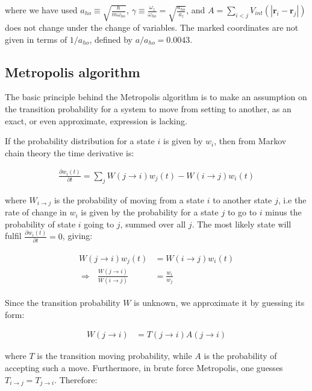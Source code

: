 \documentclass[english, a4paper]{article}
\newcommand{\bm}[1]{\mathbf{#1}}
\begin{document}
where we have used $a_{ho} \equiv \sqrt{\frac{\hbar}{m\omega_{ho}}}$, $\gamma \equiv \frac{\omega_z}{\omega_{ho}} = \sqrt{\frac{a_{ho}}{a_z}}$, and $A = \sum_{i<j} V_{int}(|\bm{r}_i-\bm{r}_j|)$ does not change under the change of variables. The marked coordinates are not given in terms of $1/a_{ho}$, defined by $a/a_{ho} = 0.0043$.

\subsection{Metropolis algorithm}
The basic principle behind the Metropolis algorithm is to make an assumption on the transition probability for a system to move from setting to another, as
an exact, or even approximate, expression is lacking.

If the probability distribution for a state $i$ is given by $w_i$, then from Markov chain theory the time derivative is:

\begin{align}
 \frac{\partial w_i(t)}{\partial t} = \sum_j W(j\rightarrow i)w_j(t) - W(i\rightarrow j)w_i(t)
\end{align}

where $W_{i\rightarrow j}$ is the probability of moving from a state $i$ to another state $j$, i.e the rate of change in $w_i$ is given by the probability for a state $j$ to go to $i$ minus the
probability of state $i$ going to $j$, summed over all $j$.
The most likely state will fulfil $\frac{\partial w_i(t)}{\partial t} = 0$, giving:

\begin{align}
\begin{split}
  W(j\rightarrow i)w_j(t) &=  W(i\rightarrow j)w_i(t)\\
 \Rightarrow\:\:\:\frac{  W(j\rightarrow i)}{  W(i\rightarrow j)} &= \frac{w_i}{w_j}
\end{split}
\end{align}

Since the transition probability $W$ is unknown, we approximate it by guessing its form:

\begin{align}
 W(j\rightarrow i) &= T(j\rightarrow i) A(j\rightarrow i)
\end{align}

where $T$ is the transition moving probability, while $A$ is the probability of accepting such a move. Furthermore, in brute force Metropolis, one guesses $T_{i\rightarrow j} = T_{j\rightarrow i}$.
Therefore:
\end{document}
